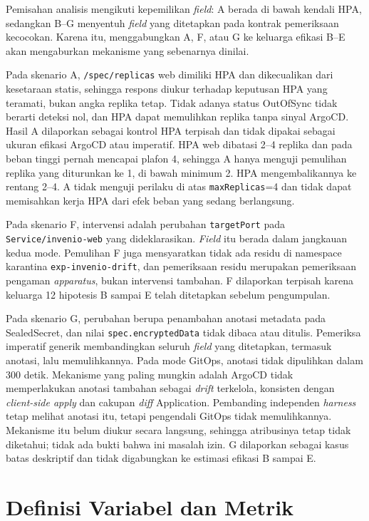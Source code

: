 Pemisahan analisis mengikuti kepemilikan \textit{field}: A berada di bawah kendali HPA, sedangkan B--G menyentuh \textit{field} yang ditetapkan pada kontrak pemeriksaan kecocokan. Karena itu, menggabungkan A, F, atau G ke keluarga efikasi B--E akan mengaburkan mekanisme yang sebenarnya dinilai.

Pada skenario A, \texttt{/spec/replicas} web dimiliki HPA dan dikecualikan dari kesetaraan statis, sehingga respons diukur terhadap keputusan HPA yang teramati, bukan angka replika tetap. Tidak adanya status OutOfSync tidak berarti deteksi nol, dan HPA dapat memulihkan replika tanpa sinyal ArgoCD. Hasil A dilaporkan sebagai kontrol HPA terpisah dan tidak dipakai sebagai ukuran efikasi ArgoCD atau imperatif. HPA web dibatasi 2--4 replika dan pada beban tinggi pernah mencapai plafon 4, sehingga A hanya menguji pemulihan replika yang diturunkan ke 1, di bawah minimum 2. HPA mengembalikannya ke rentang 2--4. A tidak menguji perilaku di atas \texttt{maxReplicas}=4 dan tidak dapat memisahkan kerja HPA dari efek beban yang sedang berlangsung.

Pada skenario F, intervensi adalah perubahan \texttt{targetPort} pada \texttt{Service/invenio-web} yang dideklarasikan. \textit{Field} itu berada dalam jangkauan kedua mode. Pemulihan F juga mensyaratkan tidak ada residu di namespace karantina \texttt{exp-invenio-drift}, dan pemeriksaan residu merupakan pemeriksaan pengaman \textit{apparatus}, bukan intervensi tambahan. F dilaporkan terpisah karena keluarga 12 hipotesis B sampai E telah ditetapkan sebelum pengumpulan.

Pada skenario G, perubahan berupa penambahan anotasi metadata pada SealedSecret, dan nilai \texttt{spec.encryptedData} tidak dibaca atau ditulis. Pemeriksa imperatif generik membandingkan seluruh \textit{field} yang ditetapkan, termasuk anotasi, lalu memulihkannya. Pada mode GitOps, anotasi tidak dipulihkan dalam 300 detik. Mekanisme yang paling mungkin adalah ArgoCD tidak memperlakukan anotasi tambahan sebagai \textit{drift} terkelola, konsisten dengan \textit{client-side apply} dan cakupan \textit{diff} Application. Pembanding independen \textit{harness} tetap melihat anotasi itu, tetapi pengendali GitOps tidak memulihkannya. Mekanisme itu belum diukur secara langsung, sehingga atribusinya tetap tidak diketahui; tidak ada bukti bahwa ini masalah izin. G dilaporkan sebagai kasus batas deskriptif dan tidak digabungkan ke estimasi efikasi B sampai E.

\section{Definisi Variabel dan Metrik}

